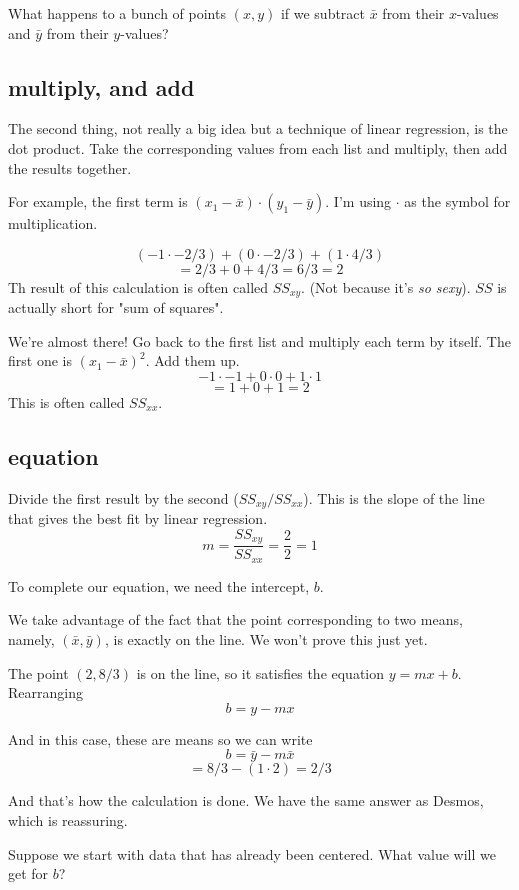 \documentclass[11pt, oneside]{article}
\begin{document}
What happens to a bunch of points $(x,y)$ if we subtract $\bar{x}$ from their $x$-values and $\bar{y}$ from their $y$-values?

\subsection*{multiply, and add}

The second thing, not really a big idea but a technique of linear regression, is the dot product.  Take the corresponding values from each list and multiply, then add the results together.

For example, the first term is $(x_1 - \bar{x}) \cdot (y_1 - \bar{y})$.  I'm using $\cdot$ as the symbol for multiplication.

\[ (-1 \cdot -2/3) + (0 \cdot -2/3) + (1 \cdot 4/3) \]
\[ = 2/3 + 0 + 4/3 = 6/3 = 2 \]
Th result of this calculation  is often called $SS_{xy}$.  (Not because it's \emph{so sexy}).  $SS$ is actually short for "sum of squares".

We're almost there!  Go back to the first list and multiply each term by itself.  The first one is $(x_1 - \bar{x})^2$.  Add them up.
\[ -1 \cdot -1 + 0 \cdot 0 + 1 \cdot 1 \]
\[ = 1 + 0 + 1 = 2 \]
This is often called $SS_{xx}$.

\subsection*{equation}
Divide the first result by the second ($SS_{xy}/SS_{xx}$).  This is the slope of the line that gives the best fit by linear regression.
\[ m = \frac{SS_{xy}}{SS_{xx}} = \frac{2}{2} = 1 \]

To complete our equation, we need the intercept, $b$.

We take advantage of the fact that the point corresponding to two means, namely, $(\bar{x},\bar{y})$, is exactly on the line.  We won't prove this just yet.

The point $(2,8/3)$ is on the line, so it satisfies the equation $y = m x + b$.  Rearranging
\[ b = y - mx \]

And in this case, these are means so we can write
\[ b = \bar{y} - m \bar{x} \]
\[ = 8/3 - (1 \cdot 2) = 2/3 \]

And that's how the calculation is done.  We have the same answer as Desmos, which is reassuring.

Suppose we start with data that has already been centered.  What value will we get for $b$?
\end{document}
